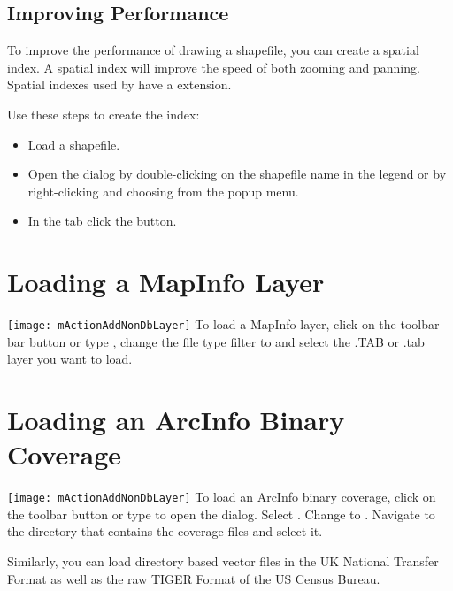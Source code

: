\subsection{Improving Performance}

To improve the performance of drawing a shapefile, you can create a spatial
index. A  spatial index will improve the
speed of both zooming and panning. Spatial indexes used by \qg have a
 extension.

Use these steps to create the index:

\begin{itemize}[label=--]
\item Load a shapefile.
\item Open the  dialog by double-clicking on the
shapefile name in the legend or by right-clicking and choosing
 from the popup menu.
\item In the tab  click the  button.
\end{itemize}

\section{Loading a MapInfo Layer}

\texttt{[image: mActionAddNonDbLayer]} To load a MapInfo layer, 
click on the  toolbar bar 
button or type , change the file type filter to 
 and 
select the .TAB or .tab layer you want to load.

\section{Loading an ArcInfo Binary Coverage}

\texttt{[image: mActionAddNonDbLayer]} To load an ArcInfo binary 
coverage, click on the  
toolbar button or type  to open the  dialog. Select . Change to 
. Navigate to the directory that 
contains the coverage files and select it.

Similarly, you can load directory based  vector files in the UK National 
Transfer Format as well as the raw TIGER Format of the US Census Bureau.

